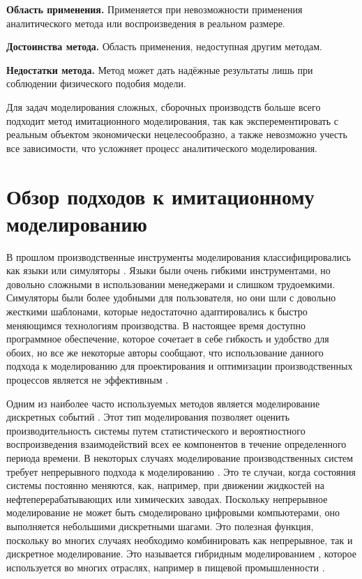 \textbf{Область применения.} Применяется при невозможности применения аналитического метода или воспроизведения в реальном размере.

\textbf{Достоинства метода.} Область применения, недоступная другим методам.

\textbf{Недостатки метода.} Метод может дать надёжные результаты лишь при соблюдении физического подобия модели.

Для задач моделирования сложных, сборочных производств больше всего подходит метод имитационного моделирования, так как эксперементировать с реальным объектом экономически нецелесообразно, а также невозможно учесть все зависимости, что усложняет процесс аналитического моделирования.

\section{Обзор подходов к имитационному моделированию}

В прошлом производственные инструменты моделирования классифицировались как языки или симуляторы \cite{Velazco}. Языки были очень гибкими инструментами, но довольно сложными в использовании менеджерами и слишком трудоемкими. Симуляторы были более удобными для пользователя, но они шли с довольно жесткими шаблонами, которые недостаточно адаптировались к быстро меняющимся технологиям производства. В настоящее время доступно программное обеспечение, которое сочетает в себе гибкость и удобство для обоих, но все же некоторые авторы сообщают, что использование данного подхода к моделированию для проектирования и оптимизации производственных процессов является не эффективным \cite{Benedettini} \cite{Holst}.

Одним из наиболее часто используемых методов является моделирование дискретных событий \cite{Detty}. Этот тип моделирования позволяет оценить производительность системы путем статистического и вероятностного воспроизведения взаимодействий всех ее компонентов в течение определенного периода времени. В некоторых случаях моделирование производственных систем требует непрерывного подхода к моделированию \cite{Robinson}. Это те случаи, когда состояния системы постоянно меняются, как, например, при движении жидкостей на нефтеперерабатывающих или химических заводах. Поскольку непрерывное моделирование не может быть смоделировано цифровыми компьютерами, оно выполняется небольшими дискретными шагами. Это полезная функция, поскольку во многих случаях необходимо комбинировать как непрерывное, так и дискретное моделирование. Это называется гибридным моделированием \cite{inproceedings}, которое используется во многих отраслях, например в пищевой промышленности \cite{Benedettini}.

